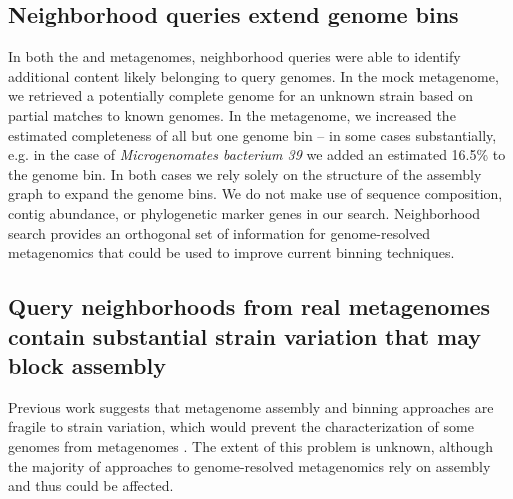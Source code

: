 %
%
%

\subsection*{Neighborhood queries extend genome bins}

In both the \podarv and \hu metagenomes, neighborhood queries were
able to identify additional content likely belonging to query genomes.
In the \podarv mock metagenome, we retrieved a potentially complete
genome for an unknown strain based on partial matches to known
genomes. In the \hu metagenome, we increased the estimated
completeness of all but one genome bin -- in some cases substantially,
e.g. in the case of {\em Microgenomates bacterium 39}
we added an estimated 16.5\% to the genome bin.  In both cases we rely
solely on the structure of the assembly graph to expand the genome
bins. We do not make use of sequence composition, contig abundance, or
phylogenetic marker genes in our search. Neighborhood search provides
an orthogonal set of information for genome-resolved metagenomics that
could be used to improve current binning techniques.

\subsection*{Query neighborhoods from real metagenomes contain substantial strain variation that may block assembly}

Previous work suggests that metagenome assembly and binning
approaches are fragile to strain variation, which
would prevent the characterization of some genomes from metagenomes
\cite{CAMI,Awad155358}.  The extent of this problem is unknown, although
the majority of approaches to genome-resolved metagenomics rely on
assembly and thus could be affected.

